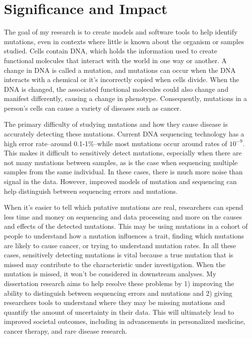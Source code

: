 \documentclass{article}
\begin{document}
\linenumbers

\section*{Significance and Impact}


The goal of my research is to create models and software tools to help identify mutations, even in contexts where little is known about the organism or samples studied.
Cells contain DNA, which holds the information used to create functional molecules that interact with the world in one way or another.
A change in DNA is called a mutation, and mutations can occur when the DNA interacts with a chemical or it's incorrectly copied when cells divide.
When the DNA is changed, the associated functional molecules could also change and manifest differently, causing a change in phenotype.
Consequently, mutations in a person's cells can cause a variety of diseases such as cancer.

The primary difficulty of studying mutations and how they cause disease is accurately detecting these mutations.
Current DNA sequencing technology has a high error rate--around 0.1-1\%--while most mutations occur around rates of $10^{-9}$.
This makes it difficult to sensitively detect mutations, especially when there are not many mutations between samples, as is the case when sequencing multiple samples from the same individual.
In these cases, there is much more noise than signal in the data.
However, improved models of mutation and sequencing can help distinguish between sequencing errors and mutations.

When it's easier to tell which putative mutations are real, researchers can spend less time and money on sequencing and data processing and more on the causes and effects of the detected mutations.
This may be using mutations in a cohort of people to understand how a mutation influences a trait, finding which mutations are likely to cause cancer, or trying to understand mutation rates. 
In all these cases, sensitively detecting mutations is vital because a true mutation that is missed may contribute to the characteristic under investigation.
When the mutation is missed, it won't be considered in downstream analyses.
My dissertation research aims to help resolve these problems by 1) improving the ability to distinguish between sequencing errors and mutations and 2) giving researchers tools to understand where they may be missing mutations and quantify the amount of uncertainty in their data.
This will ultimately lead to improved societal outcomes, including in advancements in personalized medicine, cancer therapy, and rare disease research.
\end{document}
